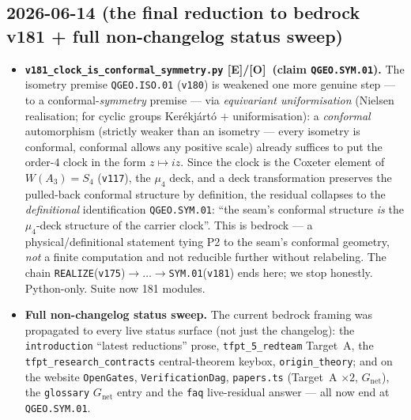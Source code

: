 \documentclass[11pt]{article}
\providecommand{\mE}{\textbf{[E]}}\providecommand{\mC}{\textbf{[C]}}
\providecommand{\mO}{\textbf{[O]}}\providecommand{\mX}{\textbf{[X]}}
\providecommand{\vref}[1]{\texttt{#1}}
\begin{document}
\subsection*{2026-06-14 (the final reduction to bedrock v181 + full non-changelog status sweep)}
\begin{itemize}
\item \textbf{\texttt{v181\_clock\_is\_conformal\_symmetry.py} \mE/\mO\ (claim \texttt{QGEO.SYM.01}).}
  The isometry premise \texttt{QGEO.ISO.01} (\vref{v180}) is weakened one more genuine step --- to a
  conformal-\emph{symmetry} premise --- via \emph{equivariant uniformisation} (Nielsen realisation; for
  cyclic groups Ker\'ekj\'art\'o $+$ uniformisation): a \emph{conformal} automorphism (strictly weaker
  than an isometry --- every isometry is conformal, conformal allows any positive scale) already suffices
  to put the order-$4$ clock in the form $z\mapsto iz$. Since the clock is the Coxeter element of
  $W(A_3)=S_4$ (\vref{v117}), the $\mu_4$ deck, and a deck transformation preserves the pulled-back
  conformal structure by definition, the residual collapses to the \emph{definitional} identification
  \texttt{QGEO.SYM.01}: ``the seam's conformal structure \emph{is} the $\mu_4$-deck structure of the
  carrier clock''. This is bedrock --- a physical/definitional statement tying P2 to the seam's conformal
  geometry, \emph{not} a finite computation and not reducible further without relabeling. The chain
  \texttt{REALIZE}(\vref{v175})$\to\dots\to$\texttt{SYM.01}(\vref{v181}) ends here; we stop honestly.
  Python-only. Suite now 181 modules.
\item \textbf{Full non-changelog status sweep.} The current bedrock framing was propagated to every
  live status surface (not just the changelog): the \texttt{introduction} ``latest reductions'' prose,
  \texttt{tfpt\_5\_redteam} Target~A, the \texttt{tfpt\_research\_contracts} central-theorem keybox,
  \texttt{origin\_theory}; and on the website \texttt{OpenGates}, \texttt{VerificationDag},
  \texttt{papers.ts} (Target~A $\times2$, $G_{\mathrm{net}}$), the \texttt{glossary} $G_{\mathrm{net}}$
  entry and the \texttt{faq} live-residual answer --- all now end at \texttt{QGEO.SYM.01}.
\end{itemize}
\end{document}
